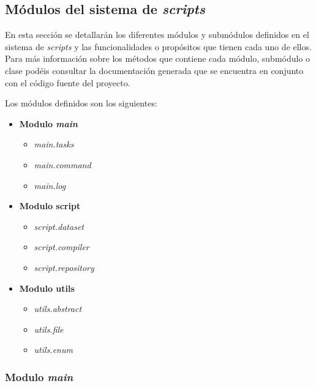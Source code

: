 \subsection{Módulos del sistema de \textit{scripts}}
\label{subsec:modulos_sistema_scripts}


En esta sección se detallarán los diferentes módulos y submódulos definidos en el sistema de \textit{scripts} y las
funcionalidades o propósitos que tienen cada uno de ellos. Para más información sobre los métodos que contiene
cada módulo, submódulo o clase podéis consultar la documentación generada que se encuentra en conjunto con
el código fuente del proyecto.

Los módulos definidos son los siguientes:

\begin{itemize}
    \item \textbf{Modulo \textit{main}}
    \begin{itemize}
        \item \textit{main.tasks}
        \item \textit{main.command}
        \item \textit{main.log}
    \end{itemize}
    \item \textbf{Modulo script}
    \begin{itemize}
        \item \textit{script.dataset}
        \item \textit{script.compiler}
        \item \textit{script.repository}
    \end{itemize}
    \item \textbf{Modulo utils}
    \begin{itemize}
        \item \textit{utils.abstract}
        \item \textit{utils.file}
        \item \textit{utils.enum}
    \end{itemize}
\end{itemize}

\subsubsection{Modulo \textit{main}}
\label{subsubsec:modulo_main}



